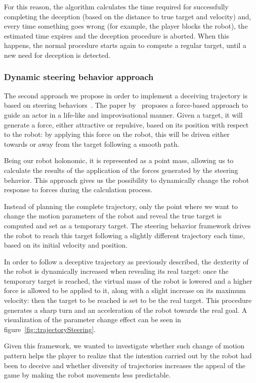 For this reason, the algorithm calculates the time required for successfully completing the deception (based on the distance to true target and velocity) and, every time something goes wrong (for example, the player blocks the robot), the estimated time expires and the deception procedure is aborted. When this happens, the normal procedure starts again to compute a regular target, until a new need for deception is detected.

\subsubsection{Dynamic steering behavior approach}
The second approach we propose in order to implement a deceiving trajectory is based on steering behaviors~\citep{reynolds_steering_1999}. The paper by~\cite{reynolds_steering_1999} proposes a force-based approach to guide an actor in a life-like and improvisational manner. Given a target, it will generate a force, either attractive or repulsive, based on its position with respect to the robot: by applying this force on the robot, this will be driven either towards or away from the target following a smooth path.

Being our robot holonomic, it is represented as a point mass, allowing us to calculate the results of the application of the forces generated by the steering behavior. This approach gives us the possibility to dynamically change the robot response to forces during the calculation process.

Instead of planning the complete trajectory, only the point where we want to change the motion parameters of the robot and reveal the true target is computed and set as a temporary target. The steering behavior framework drives the robot to reach this target following a slightly different trajectory each time, based on its initial velocity and position.

In order to follow a deceptive trajectory as previously described, the dexterity of the robot is dynamically increased when revealing its real target: once the temporary target is reached, the virtual mass of the robot is lowered and a higher force is allowed to be applied to it, along with a slight increase on its maximum velocity: then the target to be reached is set to be the real target. This procedure generates a sharp turn and an acceleration of the robot towards the real goal. A visualization of the parameter change effect can be seen in figure~\ref{fig::trajectorySteering}. 

Given this framework, we wanted to investigate whether such change of motion pattern helps the player to realize that the intention carried out by the robot had been to deceive and whether diversity of trajectories increases the appeal of the game by making the robot movements less predictable.

